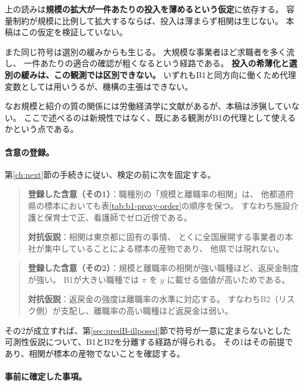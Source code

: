 \begin{remark}[機構は識別されない]
\label{rem:b1-proxy-assumption}
上の読みは\textbf{規模の拡大が一件あたりの投入を薄めるという仮定}に依存する。
容量制約が規模に比例して拡大するならば、投入は薄まらず相関は生じない。
本稿はこの仮定を検証していない。

また同じ符号は選別の緩みからも生じる。
大規模な事業者ほど求職者を多く流し、
一件あたりの適合の確認が粗くなるという経路である。
\textbf{投入の希薄化と選別の緩みは、この観測では区別できない。}
いずれもB1と同方向に働くため代理変数としては用いうるが、機構の主張はできない。

なお規模と紹介の質の関係には労働経済学に文献があるが、本稿は渉猟していない。
ここで述べるのは新規性ではなく、既にある観測がB1の代理として使えるかという点である。
\end{remark}

\paragraph{含意の登録。}
第\ref{ch:next}節の手続きに従い、検定の前に次を固定する。

\begin{quote}
\textbf{登録した含意（その1）}：職種別の「規模と離職率の相関」は、
他都道府県の標本においても表\ref{tab:b1-proxy-order}の順序を保つ。
すなわち施設介護と保育士で正、看護師でゼロ近傍である。

\textbf{対抗仮説}：相関は東京都に固有の事情、
とくに全国展開する事業者の本社が集中していることによる標本の産物であり、
他県では現れない。
\end{quote}

\begin{quote}
\textbf{登録した含意（その2）}：規模と離職率の相関が強い職種ほど、返戻金制度が強い。
B1が大きい職種では $\pi$ を $y$ に載せる価値が高いためである。

\textbf{対抗仮説}：返戻金の強度は離職率の水準に対応する。
すなわちB2（リスク側）が支配し、離職率の高い職種ほど返戻金は弱い。
\end{quote}

その2が成立すれば、第\ref{sec:predB-illposed}節で符号が一意に定まらないとした
可測性仮説について、B1とB2を分離する経路が得られる。
その1はその前提であり、相関が標本の産物でないことを確認する。

\paragraph{事前に確定した事項。}

